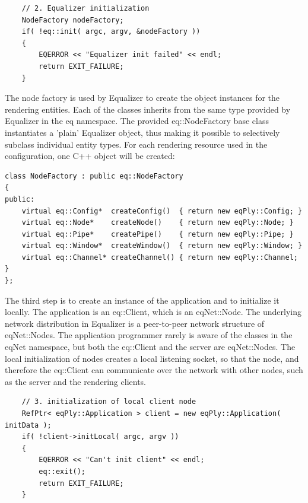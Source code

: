 \documentclass[10pt,a4]{scrartcl}
\begin{document}
{\footnotesize\begin{lstlisting}
    // 2. Equalizer initialization
    NodeFactory nodeFactory;
    if( !eq::init( argc, argv, &nodeFactory ))
    {
        EQERROR << "Equalizer init failed" << endl;
        return EXIT_FAILURE;
    }
\end{lstlisting}}%

The node factory is used by Equalizer to create the object instances for
the rendering entities. Each of the classes inherits from the same type
provided by Equalizer in the \textsf{eq} namespace. The provided
\textsf{eq::NodeFactory} base class instantiates a 'plain' Equalizer
object, thus making it possible to selectively subclass individual
entity types. For each rendering resource used in the configuration, one
C++ object will be created:

{\footnotesize\begin{lstlisting}
class NodeFactory : public eq::NodeFactory
{
public:
    virtual eq::Config*  createConfig()  { return new eqPly::Config; }
    virtual eq::Node*    createNode()    { return new eqPly::Node; }
    virtual eq::Pipe*    createPipe()    { return new eqPly::Pipe; }
    virtual eq::Window*  createWindow()  { return new eqPly::Window; }
    virtual eq::Channel* createChannel() { return new eqPly::Channel; }
};
\end{lstlisting}}

The third step is to create an instance of the application and to
initialize it locally. The application is an \textsf{eq::Client}, which
is an \textsf{eqNet::Node}. The underlying network distribution in
Equalizer is a peer-to-peer network structure of
\textsf{eqNet::Node}s. The application programmer rarely is aware of the
classes in the \textsf{eqNet} namespace, but both the
\textsf{eq::Client} and the server are \textsf{eqNet::Node}s. The local
initialization of nodes creates a local listening socket, so that the
node, and therefore the \textsf{eq::Client} can communicate over the
network with other nodes, such as the server and the rendering clients.

{\footnotesize\begin{lstlisting}
    // 3. initialization of local client node
    RefPtr< eqPly::Application > client = new eqPly::Application( initData );
    if( !client->initLocal( argc, argv ))
    {
        EQERROR << "Can't init client" << endl;
        eq::exit();
        return EXIT_FAILURE;
    }
\end{lstlisting}}%
\end{document}
